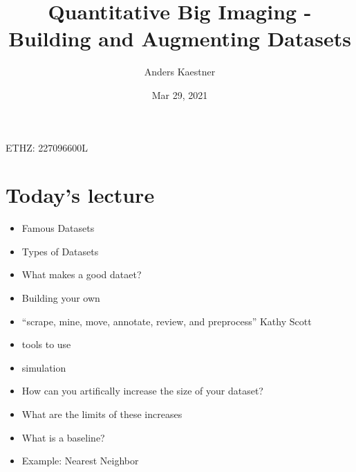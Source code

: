 \documentclass[letterpaper,10pt,english]{sphinxmanual}
\title{Quantitative Big Imaging - Building and Augmenting Datasets}
\date{Mar 29, 2021}
\author{Anders Kaestner}
\begin{document}
\pagestyle{empty}
\sphinxmaketitle
\pagestyle{plain}
\sphinxtableofcontents
\pagestyle{normal}
\label{\detokenize{03-Datasets::doc}}


\sphinxAtStartPar
{} ETHZ: 227\sphinxhyphen{}0966\sphinxhyphen{}00L




\chapter{Today’s lecture}
\label{\detokenize{03-Datasets:today-s-lecture}}
\sphinxAtStartPar
{}
\begin{itemize}
\item {} 
\sphinxAtStartPar
Famous Datasets

\item {} 
\sphinxAtStartPar
Types of Datasets

\item {} 
\sphinxAtStartPar
What makes a good dataet?

\item {} 
\sphinxAtStartPar
Building your own

\item {} 
\sphinxAtStartPar
“scrape, mine, move, annotate, review, and preprocess” \sphinxhyphen{} Kathy Scott

\item {} 
\sphinxAtStartPar
tools to use

\item {} 
\sphinxAtStartPar
simulation

\end{itemize}

\sphinxAtStartPar
{}
\begin{itemize}
\item {} 
\sphinxAtStartPar
How can you artifically increase the size of your dataset?

\item {} 
\sphinxAtStartPar
What are the limits of these increases

\end{itemize}

\sphinxAtStartPar
{}
\begin{itemize}
\item {} 
\sphinxAtStartPar
What is a baseline?

\item {} 
\sphinxAtStartPar
Example: Nearest Neighbor

\end{itemize}
\end{document}
